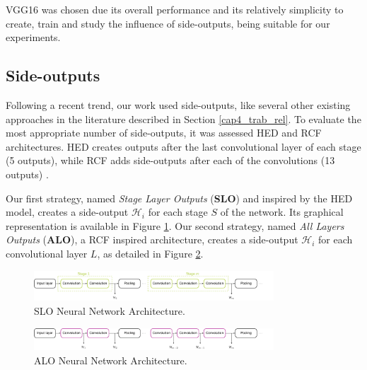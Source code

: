 VGG16 was chosen due its overall performance and its relatively simplicity to create, train and study the influence of side-outputs, being suitable for our experiments. 

\subsection{Side-outputs}
\label{cap5_saidas_laterais}

Following a recent trend, our work used side-outputs, like several other existing approaches in the literature described in Section \ref{cap4_trab_rel}.
To evaluate the most appropriate number of side-outputs, it was assessed HED and RCF architectures.
HED creates outputs after the last convolutional layer of each stage (5 outputs), while RCF adds side-outputs after each of the convolutions (13 outputs) \cite{Xie:2017:HED:3158436.3158453} \cite{RCF:2017:8100105}.

Our first strategy, named \textit{Stage Layer Outputs} (\textbf{SLO}) and inspired by the HED model, creates a side-output $\mathcal{H}_i$ for each stage $S$ of the network.
Its graphical representation is available in Figure \ref{fig:architecture_slo}.
Our second strategy, named \textit{All Layers Outputs} (\textbf{ALO}), a RCF inspired architecture, creates a side-output $\mathcal{H}_i$ for each convolutional layer $L$, as detailed in Figure \ref{fig:architecture_alo}.

\begin{figure}
  \centering
  \includegraphics[width=0.8\textwidth]{../imagens/ilustracoes/cap6_arquitetura_slo.png} %
  \caption{SLO Neural Network Architecture.}
  \label{fig:architecture_slo}
\end{figure}

\begin{figure}
  \centering
  \includegraphics[width=0.8\textwidth]{../imagens/ilustracoes/cap6_arquitetura_alo.png} %
  \caption{ALO Neural Network Architecture.}
  \label{fig:architecture_alo}
\end{figure}

